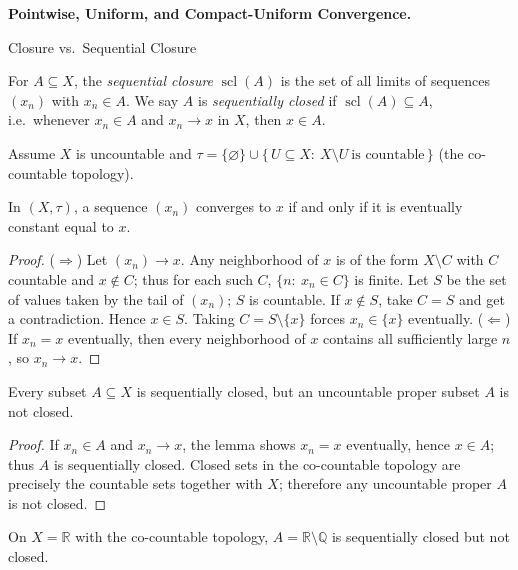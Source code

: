 \begin{problem}[CP-II-0332]
\label{prob:cp-ii-0332}
\textbf{Pointwise, Uniform, and Compact-Uniform Convergence.}

\hspace*{1.5em}Closure vs.\ Sequential Closure

For $A\subseteq X$, the \emph{sequential closure} $\operatorname{scl}(A)$ is the set of all limits of sequences $(x_n)$ with $x_n\in A$.
	We say $A$ is \emph{sequentially closed} if $\operatorname{scl}(A)\subseteq A$, i.e.\ whenever $x_n\in A$ and $x_n\to x$ in $X$, then $x\in A$.

	Assume $X$ is uncountable and $\tau=\{\varnothing\}\cup\{\,U\subseteq X:\ X\setminus U\ \text{is countable}\,\}$ (the co-countable topology).

	\begin{lemma}
		In $(X,\tau)$, a sequence $(x_n)$ converges to $x$ if and only if it is eventually constant equal to $x$.
	\end{lemma}
	\begin{proof}
		($\Rightarrow$) Let $(x_n)\to x$. Any neighborhood of $x$ is of the form $X\setminus C$ with $C$ countable and $x\notin C$; thus for each such $C$, $\{n:\ x_n\in C\}$ is finite.
		Let $S$ be the set of values taken by the tail of $(x_n)$; $S$ is countable. If $x\notin S$, take $C=S$ and get a contradiction. Hence $x\in S$. Taking $C=S\setminus\{x\}$ forces $x_n\in\{x\}$ eventually.
		($\Leftarrow$) If $x_n=x$ eventually, then every neighborhood of $x$ contains all sufficiently large $n$, so $x_n\to x$.
	\end{proof}

	\begin{proposition}
		Every subset $A\subseteq X$ is sequentially closed, but an uncountable proper subset $A$ is not closed.
	\end{proposition}
	\begin{proof}
		If $x_n\in A$ and $x_n\to x$, the lemma shows $x_n=x$ eventually, hence $x\in A$; thus $A$ is sequentially closed.
		Closed sets in the co-countable topology are precisely the countable sets together with $X$; therefore any uncountable proper $A$ is not closed.
	\end{proof}

	On $X=\mathbb{R}$ with the co-countable topology, $A=\mathbb{R}\setminus\mathbb{Q}$ is sequentially closed but not closed.


\end{problem}
